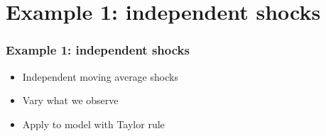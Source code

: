 \documentclass{beamer}
\begin{document}

\section{Example 1: independent shocks}
\begin{frame}
\frametitle{Example 1:  independent shocks}
\begin{itemize} \itemsep=\bigskipamount
\item Independent moving average shocks
\item Vary what we observe
\item Apply to model with Taylor rule
\end{itemize}
\end{frame}
\end{document}
